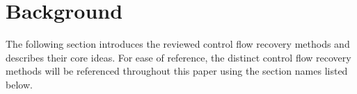 
\section{Background}

The following section introduces the reviewed control flow recovery methods and describes their core ideas. For ease of reference, the distinct control flow recovery methods will be referenced throughout this paper using the section names listed below.






